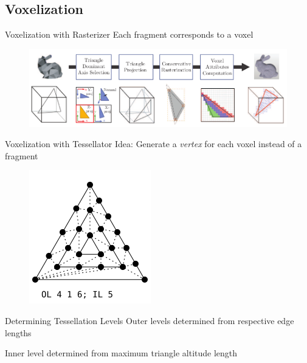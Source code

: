 \documentclass[10pt]{beamer}
\begin{document}
\subsection{Voxelization}
\begin{frame}{Voxelization with Rasterizer}
  Each fragment corresponds to a voxel

  \begin{figure}
    \includegraphics[width=\textwidth]{rasterizedvoxelization}
  \end{figure}
\end{frame}

\begin{frame}{Voxelization with Tessellator}
  Idea: Generate a \textit{vertex} for each voxel instead of a fragment


  \begin{figure}
    \includegraphics[scale=0.8]{openglwiki_tesselation.png}
  \end{figure}
\end{frame}

\begin{frame}{Determining Tessellation Levels}
  Outer levels determined from respective edge lengths

  Inner level determined from maximum triangle altitude length

\end{frame}
\end{document}
